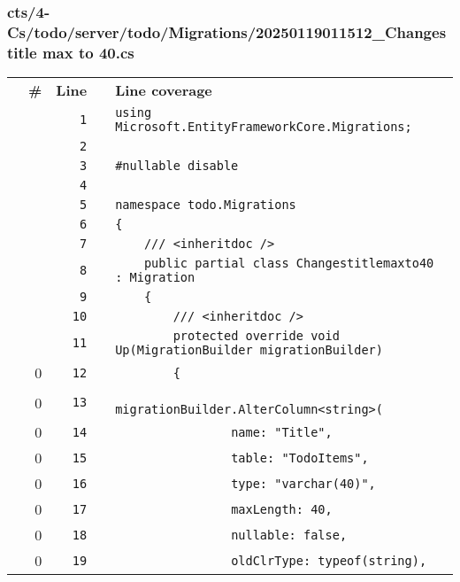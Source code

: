 \documentclass[a4paper,landscape,10pt]{article}
\begin{document}
\subsubsection{cts/4-Cs/todo/server/todo/Migrations/20250119011512\_Changes title max to 40.cs}
\begin{longtable}[l]{lrrll}
\textbf{} & \textbf{\#} & \textbf{Line} & \textbf{} & \textbf{Line coverage}\\
\cellcolor{gray} &  & \verb~1~ & & \verb~using Microsoft.EntityFrameworkCore.Migrations;~\\
\cellcolor{gray} &  & \verb~2~ & & \verb~~\\
\cellcolor{gray} &  & \verb~3~ & & \verb~#nullable disable~\\
\cellcolor{gray} &  & \verb~4~ & & \verb~~\\
\cellcolor{gray} &  & \verb~5~ & & \verb~namespace todo.Migrations~\\
\cellcolor{gray} &  & \verb~6~ & & \verb~{~\\
\cellcolor{gray} &  & \verb~7~ & & \verb~    /// <inheritdoc />~\\
\cellcolor{gray} &  & \verb~8~ & & \verb~    public partial class Changestitlemaxto40 : Migration~\\
\cellcolor{gray} &  & \verb~9~ & & \verb~    {~\\
\cellcolor{gray} &  & \verb~10~ & & \verb~        /// <inheritdoc />~\\
\cellcolor{gray} &  & \verb~11~ & & \verb~        protected override void Up(MigrationBuilder migrationBuilder)~\\
\cellcolor{red} & 0 & \verb~12~ & & \verb~        {~\\
\cellcolor{red} & 0 & \verb~13~ & & \verb~            migrationBuilder.AlterColumn<string>(~\\
\cellcolor{red} & 0 & \verb~14~ & & \verb~                name: "Title",~\\
\cellcolor{red} & 0 & \verb~15~ & & \verb~                table: "TodoItems",~\\
\cellcolor{red} & 0 & \verb~16~ & & \verb~                type: "varchar(40)",~\\
\cellcolor{red} & 0 & \verb~17~ & & \verb~                maxLength: 40,~\\
\cellcolor{red} & 0 & \verb~18~ & & \verb~                nullable: false,~\\
\cellcolor{red} & 0 & \verb~19~ & & \verb~                oldClrType: typeof(string),~\\

\end{longtable}
\end{document}

